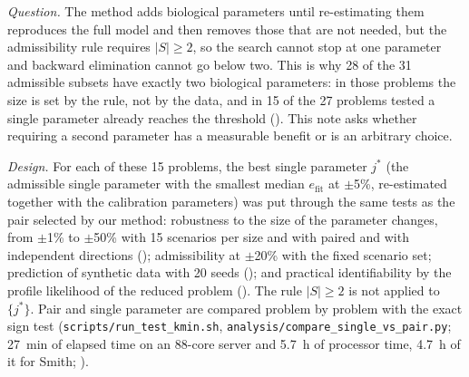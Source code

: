 

\emph{Question.} The method adds biological parameters until re-estimating them reproduces the full model and then removes those that are not needed, but the admissibility rule requires $|S|\ge2$, so the search cannot stop at one parameter and backward elimination cannot go below two. This is why 28 of the 31 admissible subsets have exactly two biological parameters: in those problems the size is set by the rule, not by the data, and in 15 of the 27 problems tested a single parameter already reaches the threshold (). This note asks whether requiring a second parameter has a measurable benefit or is an arbitrary choice.

\emph{Design.} For each of these 15 problems, the best single parameter $j^\ast$ (the admissible single parameter with the smallest median $e_{\mathrm{fit}}$ at $\pm$5\%, re-estimated together with the calibration parameters) was put through the same tests as the pair selected by our method: robustness to the size of the parameter changes, from $\pm$1\% to $\pm$50\% with 15 scenarios per size and with paired and with independent directions (); admissibility at $\pm$20\% with the fixed scenario set; prediction of synthetic data with 20 seeds (); and practical identifiability by the profile likelihood of the reduced problem (). The rule $|S|\ge2$ is not applied to $\{j^\ast\}$. Pair and single parameter are compared problem by problem with the exact sign test (\texttt{scripts/run\_test\_kmin.sh}, \texttt{analysis/compare\_single\_vs\_pair.py}; 27~min of elapsed time on an 88-core server and 5.7~h of processor time, 4.7~h of it for Smith; ).

